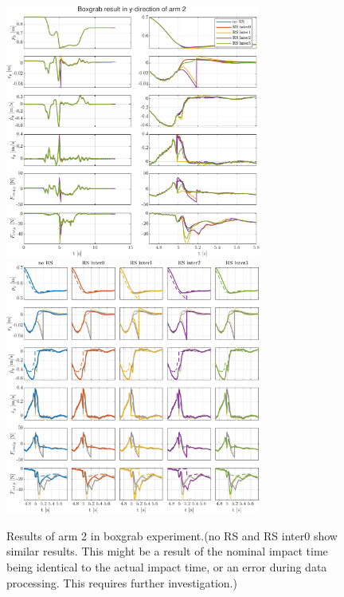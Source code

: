\documentclass[11pt]{report}
\numberwithin{equation}{section}        %
\numberwithin{figure}{section}          %
\numberwithin{table}{section}           %
\begin{document}
\begin{figure}[]
  \centering
  \begin{adjustwidth}{0pt}{5pt}
  \centering
  \includegraphics[width=0.75\textwidth]{Graphics/Boxgrab result in y-direction of arm 2_z_1.pdf}\\
    \includegraphics[width=0.75\textwidth]{Graphics/Boxgrab result in y-direction of arm 2_z_2.pdf}
  \end{adjustwidth}
  \caption{Results of arm 2 in boxgrab experiment.(no RS and RS inter0 show similar results. This might be a result of the nominal impact time being identical to the actual impact time, or an error during data processing. This requires further investigation.)}
  \label{fig:grab2}
  \end{figure}

  \newpage
  


\end{document}
